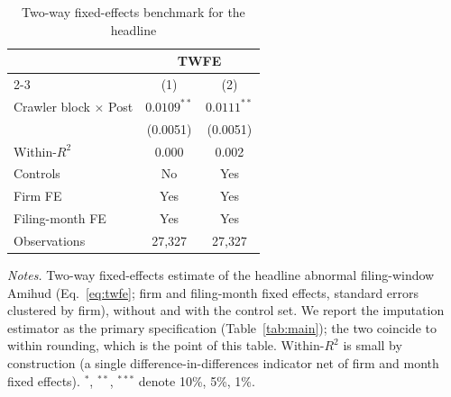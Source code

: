 \begin{table}[t]
\centering
\begin{threeparttable}
\caption{Two-way fixed-effects benchmark for the headline}
\label{tab:twfe_robustness}
\small
\begin{tabular}{lcc}
\toprule
 & \multicolumn{2}{c}{TWFE} \\
\cmidrule(lr){2-3}
 & (1) & (2) \\
\midrule
Crawler block $\times$ Post & $0.0109^{**}$ & $0.0111^{**}$ \\
                            & (0.0051)      & (0.0051) \\
Within-$R^2$                & 0.000         & 0.002 \\
\midrule
Controls         & No   & Yes \\
Firm FE          & Yes  & Yes \\
Filing-month FE  & Yes  & Yes \\
Observations     & 27{,}327 & 27{,}327 \\
\bottomrule
\end{tabular}
\begin{tablenotes}\footnotesize
\item \textit{Notes.} Two-way fixed-effects estimate of the headline abnormal filing-window Amihud (Eq.~\ref{eq:twfe}; firm and filing-month fixed effects, standard errors clustered by firm), without and with the control set. We report the \citet{BorusyakJaravelSpiess2024} imputation estimator as the primary specification (Table~\ref{tab:main}); the two coincide to within rounding, which is the point of this table. Within-$R^2$ is small by construction (a single difference-in-differences indicator net of firm and month fixed effects). $^{*}$, $^{**}$, $^{***}$ denote 10\%, 5\%, 1\%.
\end{tablenotes}
\end{threeparttable}
\end{table}
